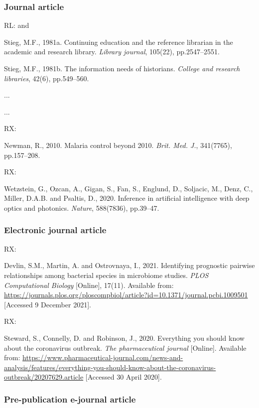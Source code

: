 \subsubsection*{Journal article}

RL: \cite{stieg1981cer} and \cite{stieg1981inh}

Stieg, M.F., 1981a. Continuing education and the reference librarian in the academic and research library. \emph{Library journal}, 105(22), pp.2547--2551.

Stieg, M.F., 1981b. The information needs of historians. \emph{College and research libraries}, 42(6), pp.549--560.

...


...

RX: \cite{newman2010mcb}

Newman, R., 2010. Malaria control beyond 2010. \emph{Brit. Med. J.}, 341(7765), pp.157--208.


RX: \cite{wetzstein.etal2020iai}

Wetzstein, G., Ozcan, A., Gigan, S., Fan, S., Englund, D., Soljacic, M., Denz, C., Miller, D.A.B. and Psaltis, D., 2020. Inference in artificial intelligence with deep optics and photonics. \emph{Nature}, 588(7836), pp.39--47.



\subsubsection*{Electronic journal article}

RX: \cite{devlin.etal2021ipp}

Devlin, S.M., Martin, A. and Ostrovnaya, I., 2021. Identifying prognostic pairwise relationships among bacterial species in microbiome studies. \emph{PLOS Computational Biology} [Online], 17(11). Available from: \url{https://journals.plos.org/ploscompbiol/article?id=10.1371/journal.pcbi.1009501} [Accessed 9 December 2021].


RX: \cite{steward.etal2020eys}

Steward, S., Connelly, D. and Robinson, J., 2020. Everything you should know about the coronavirus outbreak. \emph{The pharmaceutical journal} [Online]. Available from: \url{https://www.pharmaceutical-journal.com/news-and-analysis/features/everything-you-should-know-about-the-coronavirus-outbreak/20207629.article} [Accessed 30 April 2020].



\subsubsection*{Pre-publication e-journal article}

